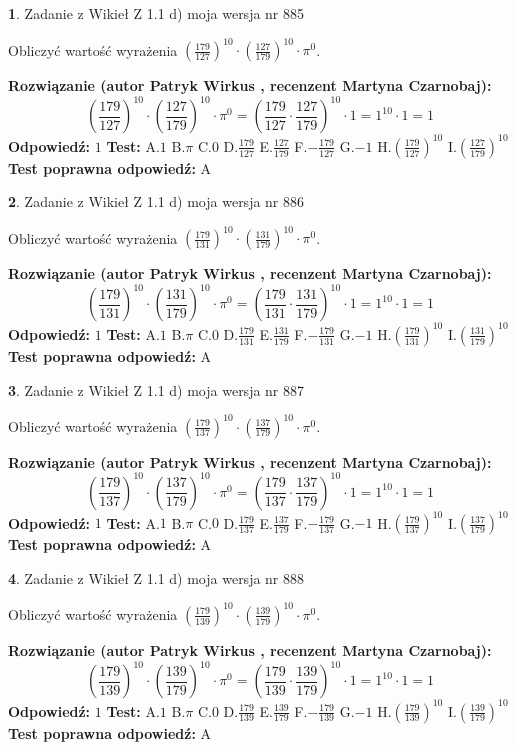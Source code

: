 \documentclass[12pt, a4paper]{article}
\theoremstyle{definition} %
\newtheorem{zad}{}
\newcommand{\zadStart}[1]{\begin{zad}#1\newline}
\newcommand{\zadStop}{\end{zad}}
\newcommand{\rozwStart}[2]{\noindent \textbf{Rozwiązanie (autor #1 , recenzent #2): }\newline}
\newcommand{\rozwStop}{\newline}
\newcommand{\odpStart}{\noindent \textbf{Odpowiedź:}\newline}
\newcommand{\odpStop}{\newline}
\newcommand{\testStart}{\noindent \textbf{Test:}\newline}
\newcommand{\testStop}{\newline}
\newcommand{\kluczStart}{\noindent \textbf{Test poprawna odpowiedź:}\newline}
\newcommand{\kluczStop}{\newline}
\begin{document}
\zadStart{Zadanie z Wikieł Z 1.1 d) moja wersja nr 885}

Obliczyć wartość wyrażenia $(\frac{179}{127})^{10} \cdot (\frac{127}{179})^{10} \cdot \pi^{0}$.
\zadStop
\rozwStart{Patryk Wirkus}{Martyna Czarnobaj}
$$(\frac{179}{127})^{10} \cdot (\frac{127}{179})^{10} \cdot \pi^{0} = (\frac{179}{127} \cdot \frac{127}{179})^{10} \cdot 1 = 1^{10} \cdot 1 = 1$$
\rozwStop
\odpStart
$1$
\odpStop
\testStart
A.$1$ B.$\pi$ C.$0$ D.$\frac{179}{127}$ E.$\frac{127}{179}$
F.$-\frac{179}{127}$ G.$-1$
H.$(\frac{179}{127})^{10}$
I.$(\frac{127}{179})^{10}$
\testStop
\kluczStart
A
\kluczStop



\zadStart{Zadanie z Wikieł Z 1.1 d) moja wersja nr 886}

Obliczyć wartość wyrażenia $(\frac{179}{131})^{10} \cdot (\frac{131}{179})^{10} \cdot \pi^{0}$.
\zadStop
\rozwStart{Patryk Wirkus}{Martyna Czarnobaj}
$$(\frac{179}{131})^{10} \cdot (\frac{131}{179})^{10} \cdot \pi^{0} = (\frac{179}{131} \cdot \frac{131}{179})^{10} \cdot 1 = 1^{10} \cdot 1 = 1$$
\rozwStop
\odpStart
$1$
\odpStop
\testStart
A.$1$ B.$\pi$ C.$0$ D.$\frac{179}{131}$ E.$\frac{131}{179}$
F.$-\frac{179}{131}$ G.$-1$
H.$(\frac{179}{131})^{10}$
I.$(\frac{131}{179})^{10}$
\testStop
\kluczStart
A
\kluczStop



\zadStart{Zadanie z Wikieł Z 1.1 d) moja wersja nr 887}

Obliczyć wartość wyrażenia $(\frac{179}{137})^{10} \cdot (\frac{137}{179})^{10} \cdot \pi^{0}$.
\zadStop
\rozwStart{Patryk Wirkus}{Martyna Czarnobaj}
$$(\frac{179}{137})^{10} \cdot (\frac{137}{179})^{10} \cdot \pi^{0} = (\frac{179}{137} \cdot \frac{137}{179})^{10} \cdot 1 = 1^{10} \cdot 1 = 1$$
\rozwStop
\odpStart
$1$
\odpStop
\testStart
A.$1$ B.$\pi$ C.$0$ D.$\frac{179}{137}$ E.$\frac{137}{179}$
F.$-\frac{179}{137}$ G.$-1$
H.$(\frac{179}{137})^{10}$
I.$(\frac{137}{179})^{10}$
\testStop
\kluczStart
A
\kluczStop



\zadStart{Zadanie z Wikieł Z 1.1 d) moja wersja nr 888}

Obliczyć wartość wyrażenia $(\frac{179}{139})^{10} \cdot (\frac{139}{179})^{10} \cdot \pi^{0}$.
\zadStop
\rozwStart{Patryk Wirkus}{Martyna Czarnobaj}
$$(\frac{179}{139})^{10} \cdot (\frac{139}{179})^{10} \cdot \pi^{0} = (\frac{179}{139} \cdot \frac{139}{179})^{10} \cdot 1 = 1^{10} \cdot 1 = 1$$
\rozwStop
\odpStart
$1$
\odpStop
\testStart
A.$1$ B.$\pi$ C.$0$ D.$\frac{179}{139}$ E.$\frac{139}{179}$
F.$-\frac{179}{139}$ G.$-1$
H.$(\frac{179}{139})^{10}$
I.$(\frac{139}{179})^{10}$
\testStop
\kluczStart
A
\kluczStop
\end{document}
